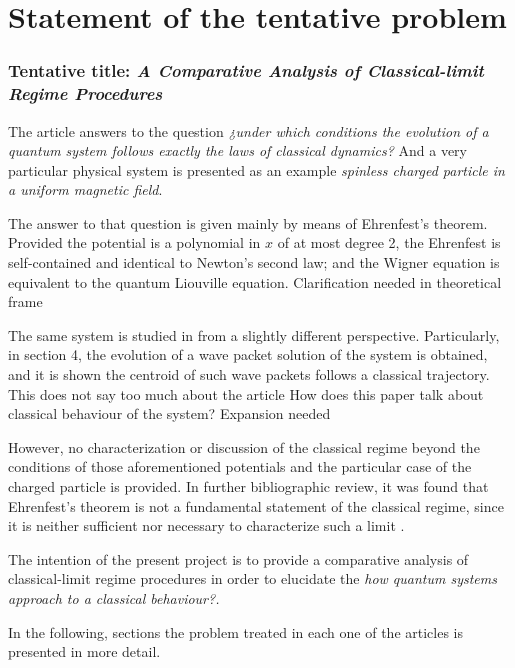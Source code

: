 \chapter{Statement of the tentative problem}

\subsection*{Tentative title: \emph{A Comparative Analysis of Classical-limit Regime Procedures}}

The article \cite{manfrediQuantumSystemsThat1993} answers to the question \emph{¿under which conditions the evolution of a quantum system follows exactly the laws of classical dynamics?} And a very particular physical system is presented as an example \emph{spinless charged particle in a uniform magnetic field}. 

The answer to that question is given mainly by means of Ehrenfest’s theorem. Provided the potential is a polynomial in $x$ of at most degree 2, the Ehrenfest is self-contained and identical to Newton's second law; and the Wigner equation is equivalent to the quantum Liouville equation. \alert{Clarification needed in theoretical frame}

The same system is studied in \cite{britoParticleUniformMagnetic2007} from a slightly different perspective. Particularly, in section 4, the evolution of a wave packet solution of the system is obtained, and it is shown the centroid of such wave packets follows a classical trajectory. 
\alert{This does not say too much about the article}
\alert{How does this paper talk about classical behaviour of the system? Expansion needed}

However, no characterization or discussion of the classical regime beyond the conditions of those aforementioned potentials and the particular case of the charged particle is provided. In further bibliographic review, it was found that Ehrenfest’s theorem is not a fundamental statement of the classical regime, since it is neither sufficient nor necessary to characterize such a limit \cite{ballentineInadequacyEhrenfestTheorem1994}.

The intention of the present project is to provide a comparative analysis of classical-limit regime procedures in order to elucidate the \emph{how quantum systems approach to a classical behaviour?.}

In the following, sections the problem treated in each one of the articles is presented in more detail.

